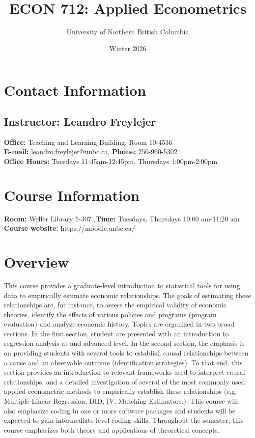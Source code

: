 \documentclass[letterpaper,12pt]{article}
\title{\vspace{-2.4cm} ECON 712: Applied Econometrics}
\author{University of Northern British Columbia}
\date{Winter 2026}
\theoremstyle{dotlessS}
\begin{document}
\maketitle
\vspace{-1cm}
\noindent\makebox[\linewidth]{\rule{\textwidth}{1.5pt}}
\section{Contact Information}
\subsection*{Instructor: Leandro Freylejer}
\textbf{Office:} Teaching and Learning Building, Room 10-4536 \\
\textbf{E-mail:} leandro.freylejer@unbc.ca, \textbf{Phone:} 250-960-5302 \\
\textbf{Office Hours:} Tuesdays 11:45am-12:45pm, Thursdays 1:00pm-2:00pm
\section{Course Information}
\textbf{Room:} Weller Library 5-307 ,\textbf{Time:} Tuesdays, Thursdays 10:00 am-11:20 am \\
\textbf{Course website:} https://moodle.unbc.ca/

\section{Overview}

This course provides a graduate-level introduction to statistical tools for using data to empirically estimate economic relationships. The goals of estimating these relationships are, for instance, to assess the empirical validity of economic theories, identify the effects of various policies and programs (program evaluation) and analyze economic history. Topics are organized in two broad sections. In the first section, student are presented with an introduction to regression analysis at and advanced level. In the second section, the emphasis is on providing students with several tools to establish causal relationships between a cause and an observable outcome (identification strategies). To that end, this section provides an introduction to relevant frameworks used to interpret causal relationships, and a detailed investigation of several of the most commonly used applied econometric methods to empirically establish these relationships (e.g. Multiple Linear Regression, DID, IV, Matching Estimators.). This course will also emphasize coding in one or more software packages and students will be expected to gain intermediate-level coding skills. Throughout the semester, this course emphasizes both theory and applications of theoretical concepts. 
\end{document}
